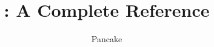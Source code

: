 \documentclass[openany, 12pt, b5paper]{memoir}
\begin{document}
\title{\langname : A Complete Reference}
\author{Pancake}
\frontmatter
\maketitle
\newpage
\begin{KeepFromToc}
  \tableofcontents
\end{KeepFromToc}
\mainmatter





% 
\backmatter
\end{document}
